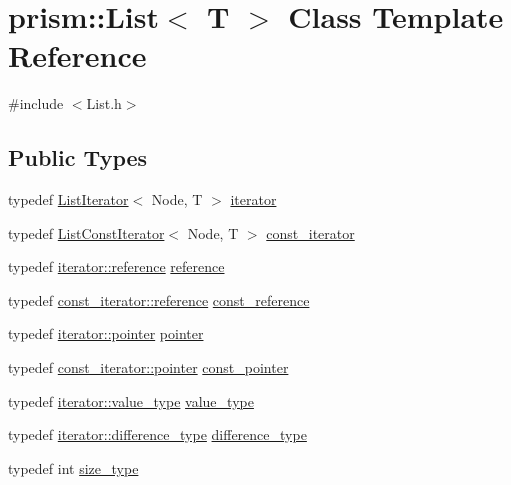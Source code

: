 \hypertarget{classprism_1_1_list}{}\section{prism\+:\+:List$<$ T $>$ Class Template Reference}
\label{classprism_1_1_list}


{\ttfamily \#include $<$List.\+h$>$}

\subsection*{Public Types}
\begin{DoxyCompactItemize}
\item 
typedef \hyperlink{structprism_1_1_list_iterator}{List\+Iterator}$<$ Node, T $>$ \hyperlink{classprism_1_1_list_a6cf00c98a428ed325fe9ccc60d7ef95a}{iterator}
\item 
typedef \hyperlink{structprism_1_1_list_const_iterator}{List\+Const\+Iterator}$<$ Node, T $>$ \hyperlink{classprism_1_1_list_a038bd36af263a85110467528db8305d5}{const\+\_\+iterator}
\item 
typedef \hyperlink{structprism_1_1_list_iterator_a8102dfe3c26bb09d44c54ce276debf69}{iterator\+::reference} \hyperlink{classprism_1_1_list_aace7abca3cacb471bba9f04bba680fc3}{reference}
\item 
typedef \hyperlink{structprism_1_1_list_const_iterator_ad35238dd195319f3f07c12769b52b472}{const\+\_\+iterator\+::reference} \hyperlink{classprism_1_1_list_a908620eac035bd6d020d69919aeffcbe}{const\+\_\+reference}
\item 
typedef \hyperlink{structprism_1_1_list_iterator_a7df7f6f08916f0bbe2e0b0ce675e0cee}{iterator\+::pointer} \hyperlink{classprism_1_1_list_aed257df5c1db1015841de21318b6c5c2}{pointer}
\item 
typedef \hyperlink{structprism_1_1_list_const_iterator_a1c92e5a7b7d0a92c744027ca421cb651}{const\+\_\+iterator\+::pointer} \hyperlink{classprism_1_1_list_ab7be76433c8a90f198e268a0918e8a6b}{const\+\_\+pointer}
\item 
typedef \hyperlink{structprism_1_1_list_iterator_a9df2822c03b49086c3ddf55ac4816321}{iterator\+::value\+\_\+type} \hyperlink{classprism_1_1_list_a7f20672ea7b8f748420548308e07dbc1}{value\+\_\+type}
\item 
typedef \hyperlink{structprism_1_1_list_iterator_a1353d7adf61676d3913acaa1b00fed94}{iterator\+::difference\+\_\+type} \hyperlink{classprism_1_1_list_a98f5a94db7ed98f032ee32ee34bbc8c8}{difference\+\_\+type}
\item 
typedef int \hyperlink{classprism_1_1_list_a1d3fe26a6fe0ec8f6a63e70bb59979bd}{size\+\_\+type}
\end{DoxyCompactItemize}
